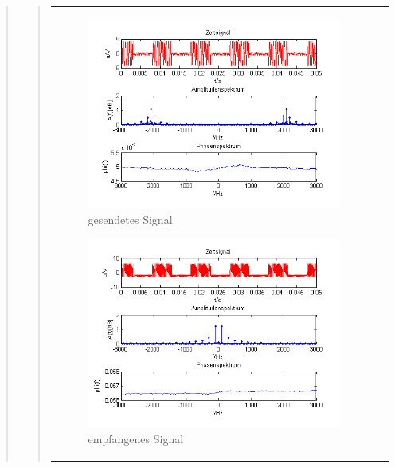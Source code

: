 \begin{quote}
\begin{quote}
\begin{center}
\begin{tabular}{ll}
\begin{minipage}{0.6\textwidth}
                \begin{figure}[H]
                    \label{fig:DemorechteckoT}
                    \includegraphics[scale=0.7]{Bilder/Am_Rec_2k_100Hz_mo}
                    \caption{gesendetes Signal}
                \end{figure}
        
            \end{minipage}
        
            \begin{minipage}{0.6\textwidth}
                \begin{figure}[H]
                    \label{fig:DemorechteckoT2}
                    \includegraphics[scale=0.7]{Bilder/Demo_Rec_2k_100Hz_mo_ohneTiefpass}
                    \caption{empfangenes Signal}
                \end{figure}
        

\end{minipage}
\end{tabular}
\end{center}
\end{quote}
\end{quote}
